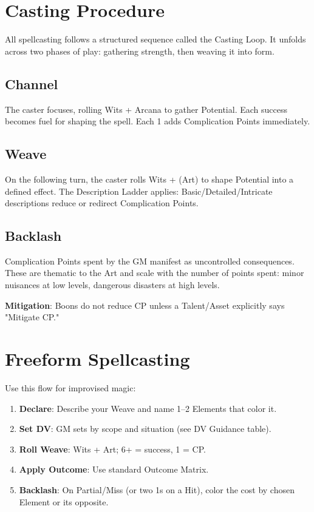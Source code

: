 \section{Casting Procedure}

All spellcasting follows a structured sequence called the Casting Loop. It unfolds across two phases of play: gathering strength, then weaving it into form.

\subsection{Channel}
The caster focuses, rolling Wits + Arcana to gather Potential. Each success becomes fuel for shaping the spell. Each 1 adds Complication Points immediately.

\subsection{Weave}
On the following turn, the caster rolls Wits + (Art) to shape Potential into a defined effect. The Description Ladder applies: Basic/Detailed/Intricate descriptions reduce or redirect Complication Points.

\subsection{Backlash}
Complication Points spent by the GM manifest as uncontrolled consequences. These are thematic to the Art and scale with the number of points spent: minor nuisances at low levels, dangerous disasters at high levels.

\textbf{Mitigation}: Boons do not reduce CP unless a Talent/Asset explicitly says "Mitigate CP."

\section{Freeform Spellcasting}

Use this flow for improvised magic:

\begin{enumerate}
  \item \textbf{Declare}: Describe your Weave and name 1–2 Elements that color it.
  \item \textbf{Set DV}: GM sets by scope and situation (see DV Guidance table).
  \item \textbf{Roll Weave}: Wits + Art; 6+ = success, 1 = CP.
  \item \textbf{Apply Outcome}: Use standard Outcome Matrix.
  \item \textbf{Backlash}: On Partial/Miss (or two 1s on a Hit), color the cost by chosen Element or its opposite.
\end{enumerate}

